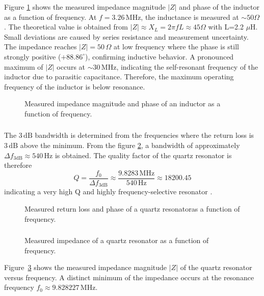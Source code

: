 \documentclass[a4paper,12pt]{article}
\begin{document}
	Figure \ref{fig:352} shows the measured impedance magnitude $|Z|$ and phase of the inductor as a
	function of frequency.
	At $f = 3.26\,\mathrm{MHz}$, the inductance is measured at $\sim50 \Omega$. The theoretical value is obtained from
	$|Z| \approx X_L = 2\pi f L \approx 45 \Omega$ with L=2.2 $\mu$H.
	Small deviations are caused by series resistance and measurement uncertainty.
	The impedance reaches $|Z| = 50\,\Omega$ at low frequency where the phase is still
	strongly positive ($+88.86^\circ$), confirming inductive behavior.
	A pronounced maximum of $|Z|$ occurs at $\sim30\,\mathrm{MHz}$, indicating
	the self-resonant frequency of the inductor due to parasitic capacitance.
	Therefore, the maximum operating frequency of the inductor is below resonance.
	
	\begin{figure}[H]
		\centering
		
		\caption{Measured impedance magnitude and phase of an inductor as a function of frequency.}
		\label{fig:352}
	\end{figure}
	
	\subsubsection{}
	
	The $3\,\mathrm{dB}$ bandwidth is determined from the frequencies where the return loss
	is $3\,\mathrm{dB}$ above the minimum. From the figure \ref{fig:353}, a bandwidth of approximately
	$\Delta f_{3\mathrm{dB}} \approx 540\,\mathrm{Hz}$ is obtained.
	The quality factor of the quartz resonator is therefore
	\[
	Q = \frac{f_0}{\Delta f_{3\mathrm{dB}}} \approx \frac{9.8283\,\mathrm{MHz}}{540\,\mathrm{Hz}}
	\approx 18200.45
	\]
	indicating a very high Q and highly frequency-selective resonator \cite{bohmer2018}.
	
	\begin{figure}[H]
		\centering
		
		\caption{Measured return loss and phase of a quartz resonatoras a function of frequency.}
		\label{fig:353}
	\end{figure}
	
	\subsubsection{}
	\begin{figure}[H]
		\centering
		
		\caption{Measured impedance of a quartz resonator as a function of frequency.}
		\label{fig:354}
	\end{figure}
	Figure~\ref{fig:354} shows the measured impedance magnitude $|Z|$ of the quartz resonator versus
	frequency. A distinct minimum of the impedance occurs at the resonance frequency
	$f_0 \approx 9.828227\,\mathrm{MHz}$.
	
\end{document}
